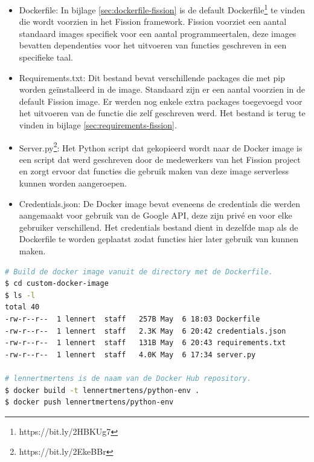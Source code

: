 \begin{itemize}
    \item Dockerfile: In bijlage \ref{sec:dockerfile-fission} is de default Dockerfile\footnote{https://bit.ly/2HBKUg7} te vinden die wordt voorzien in het Fission framework. Fission voorziet een aantal standaard images specifiek voor een aantal programmeertalen, deze images bevatten dependenties voor het uitvoeren van functies geschreven in een specifieke taal.
    \item Requirements.txt: Dit bestand bevat verschillende packages die met pip worden geïnstalleerd in de image. Standaard zijn er een aantal voorzien in de default Fission image. Er werden nog enkele extra packages toegevoegd voor het uitvoeren van de functie die zelf geschreven werd. Het bestand is terug te vinden in bijlage \ref{sec:requirements-fission}.
    \item Server.py\footnote{https://bit.ly/2EkeBBr}: Het Python script dat gekopieerd wordt naar de Docker image is een script dat werd geschreven door de medewerkers van het Fission project en zorgt ervoor dat functies die gebruik maken van deze image serverless kunnen worden aangeroepen. 
    \item Credentials.json: De Docker image bevat eveneens de credentials die werden aangemaakt voor gebruik van de Google API, deze zijn privé en voor elke gebruiker verschillend. Het credentials bestand dient in dezelfde map als de Dockerfile te worden geplaatst zodat functies hier later gebruik van kunnen maken. 
\end{itemize}

\begin{lstlisting}[language=bash]
# Build de docker image vanuit de directory met de Dockerfile.
$ cd custom-docker-image
$ ls -l
total 40
-rw-r--r--  1 lennert  staff   257B May  6 18:03 Dockerfile
-rw-r--r--  1 lennert  staff   2.3K May  6 20:42 credentials.json
-rw-r--r--  1 lennert  staff   131B May  6 20:43 requirements.txt
-rw-r--r--  1 lennert  staff   4.0K May  6 17:34 server.py

# lennertmertens is de naam van de Docker Hub repository.
$ docker build -t lennertmertens/python-env . 
$ docker push lennertmertens/python-env
\end{lstlisting}

